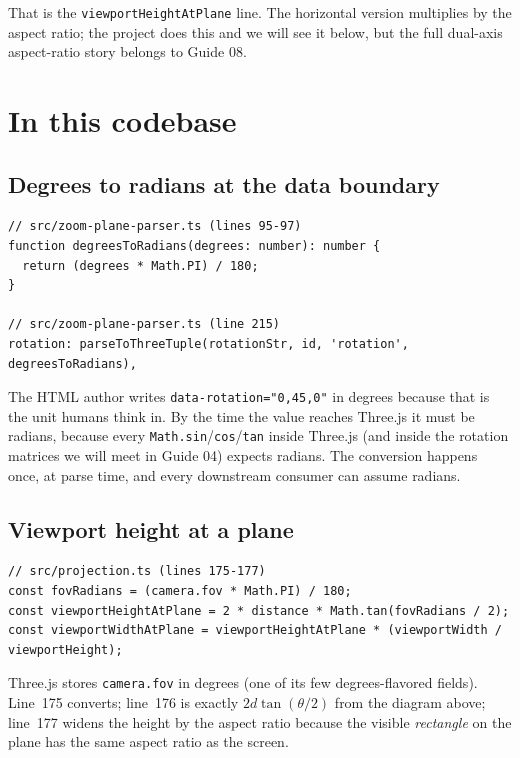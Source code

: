 \documentclass{article}
\begin{document}
That is the \lstinline{viewportHeightAtPlane} line. The horizontal version
multiplies by the aspect ratio; the project does this and we will see it
below, but the full dual-axis aspect-ratio story belongs to Guide 08.

\section{In this codebase}

\subsection{Degrees to radians at the data boundary}

\begin{lstlisting}
// src/zoom-plane-parser.ts (lines 95-97)
function degreesToRadians(degrees: number): number {
  return (degrees * Math.PI) / 180;
}

// src/zoom-plane-parser.ts (line 215)
rotation: parseToThreeTuple(rotationStr, id, 'rotation', degreesToRadians),
\end{lstlisting}

The HTML author writes \lstinline{data-rotation="0,45,0"} in degrees because
that is the unit humans think in. By the time the value reaches Three.js it
must be radians, because every \lstinline{Math.sin}/\lstinline{cos}/\lstinline{tan}
inside Three.js (and inside the rotation matrices we will meet in Guide 04)
expects radians. The conversion happens once, at parse time, and every
downstream consumer can assume radians.

\subsection{Viewport height at a plane}

\begin{lstlisting}
// src/projection.ts (lines 175-177)
const fovRadians = (camera.fov * Math.PI) / 180;
const viewportHeightAtPlane = 2 * distance * Math.tan(fovRadians / 2);
const viewportWidthAtPlane = viewportHeightAtPlane * (viewportWidth / viewportHeight);
\end{lstlisting}

Three.js stores \lstinline{camera.fov} in degrees (one of its few
degrees-flavored fields). Line~175 converts; line~176 is exactly
$2 d \tan(\theta/2)$ from the diagram above; line~177 widens the height by the
aspect ratio because the visible \emph{rectangle} on the plane has the same
aspect ratio as the screen.
\end{document}

